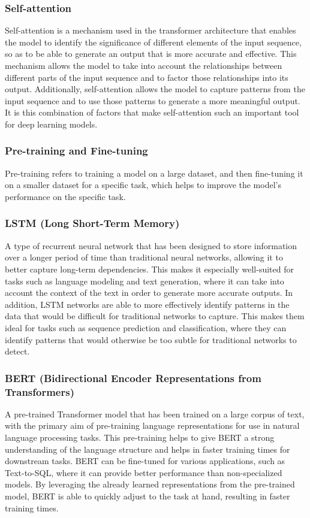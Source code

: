 \subsubsection{Self-attention} Self-attention is a mechanism used in the transformer architecture that enables the model to identify the significance of different elements of the input sequence, so as to be able to generate an output that is more accurate and effective. This mechanism allows the model to take into account the relationships between different parts of the input sequence and to factor those relationships into its output. Additionally, self-attention allows the model to capture patterns from the input sequence and to use those patterns to generate a more meaningful output. It is this combination of factors that make self-attention such an important tool for deep learning models.
\subsubsection{Pre-training and Fine-tuning} Pre-training refers to training a model on a large dataset, and then fine-tuning it on a smaller dataset for a specific task, which helps to improve the model's performance on the specific task.
\subsubsection{LSTM (Long Short-Term Memory)} A type of recurrent neural network that has been designed to store information over a longer period of time than traditional neural networks, allowing it to better capture long-term dependencies\cite{Hochreiter1997LongSM}. This makes it especially well-suited for tasks such as language modeling and text generation, where it can take into account the context of the text in order to generate more accurate outputs. In addition, LSTM networks are able to more effectively identify patterns in the data that would be difficult for traditional networks to capture. This makes them ideal for tasks such as sequence prediction and classification, where they can identify patterns that would otherwise be too subtle for traditional networks to detect.
\subsubsection{BERT (Bidirectional Encoder Representations from Transformers)} A pre-trained Transformer model that has been trained on a large corpus of text, with the primary aim of pre-training language representations for use in natural language processing tasks\cite{devlin-etal-2019-bert}. This pre-training helps to give BERT a strong understanding of the language structure and helps in faster training times for downstream tasks. BERT can be fine-tuned for various applications, such as Text-to-SQL, where it can provide better performance than non-specialized models. By leveraging the already learned representations from the pre-trained model, BERT is able to quickly adjust to the task at hand, resulting in faster training times.
